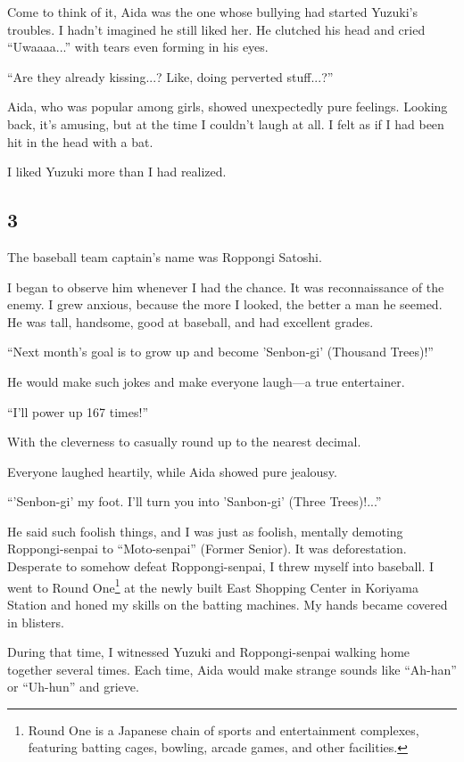 \documentclass[
    a4paper,
    12pt,
    twoside,
    openany,
    UTF8,
    fontset=windows
]{ctexbook}
\begin{document}
Come to think of it, Aida was the one whose bullying had started Yuzuki's troubles. I hadn't imagined he still liked her. He clutched his head and cried ``Uwaaaa...'' with tears even forming in his eyes.

``Are they already kissing...? Like, doing perverted stuff...?''

Aida, who was popular among girls, showed unexpectedly pure feelings. Looking back, it's amusing, but at the time I couldn't laugh at all. I felt as if I had been hit in the head with a bat.

I liked Yuzuki more than I had realized.


\subsection*{3}

The baseball team captain's name was Roppongi Satoshi.

I began to observe him whenever I had the chance. It was reconnaissance of the enemy. I grew anxious, because the more I looked, the better a man he seemed. He was tall, handsome, good at baseball, and had excellent grades.

``Next month's goal is to grow up and become 'Senbon-gi' (Thousand Trees)!''

He would make such jokes and make everyone laugh---a true entertainer.

``I'll power up 167 times!''

With the cleverness to casually round up to the nearest decimal.

Everyone laughed heartily, while Aida showed pure jealousy.

``'Senbon-gi' my foot. I'll turn you into 'Sanbon-gi' (Three Trees)!...''

He said such foolish things, and I was just as foolish, mentally demoting Roppongi-senpai to ``Moto-senpai'' (Former Senior). It was deforestation. Desperate to somehow defeat Roppongi-senpai, I threw myself into baseball. I went to Round One\footnote{Round One is a Japanese chain of sports and entertainment complexes, featuring batting cages, bowling, arcade games, and other facilities.} at the newly built East Shopping Center in Koriyama Station and honed my skills on the batting machines. My hands became covered in blisters.

During that time, I witnessed Yuzuki and Roppongi-senpai walking home together several times. Each time, Aida would make strange sounds like ``Ah-han'' or ``Uh-hun'' and grieve.
\end{document}
